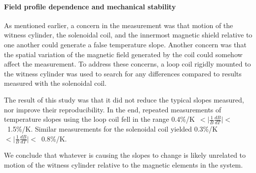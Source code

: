 %
%

\paragraph{Field profile dependence and mechanical stability}

As mentioned earlier, a concern in the measurement was that motion of
the witness cylinder, the solenoidal coil, and the innermost magnetic
shield relative to one another could generate a false temperature
slope.  Another concern was that the spatial variation of the magnetic
field generated by the coil could somehow affect the measurement.  To
address these concerns, a loop coil rigidly mounted to the witness
cylinder was used to search for any differences compared to results
measured with the solenoidal coil.

The result of this study was that it did not reduce the typical slopes
measured, nor improve their reproducibility.  In the end, repeated
measurements of temperature slopes using the loop coil fell in the
range
0.4\%/K~$<\vert\frac{1}{B}\frac{dB}{dT}\vert<$~1.5\%/K.
Similar measurements for the solenoidal coil yielded
0.3\%/K~$<\vert\frac{1}{B}\frac{dB}{dT}\vert<$~0.8\%/K.


We conclude that whatever is causing the slopes to change is likely
unrelated to motion of the witness cylinder relative to the magnetic
elements in the system.


